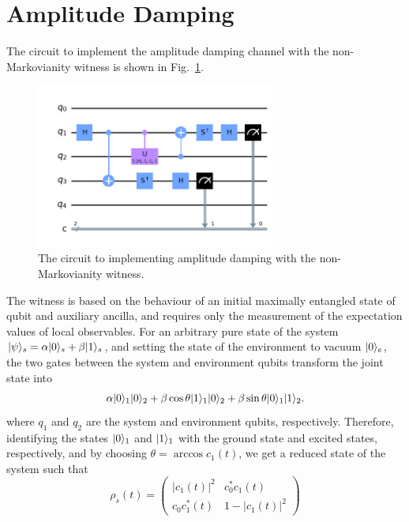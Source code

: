 \documentclass[12pt]{article}
\DeclarePairedDelimiter{\ket}{\lvert}{\rangle}
\begin{document}
  \section{Amplitude Damping}
  The circuit to implement the amplitude damping channel with the non-Markovianity witness is shown in Fig.~\ref{fig:amplitude_damping_circuit}.
  \begin{figure}
    \centering
    \includegraphics[width=0.7\textwidth]{images/amplitude_damping_yy_circuit.png}
    \caption{The circuit to implementing amplitude damping with the non-Markovianity witness.%
      \label{fig:amplitude_damping_circuit}}
  \end{figure}
  The witness is based on the behaviour of an initial maximally entangled state of qubit and auxiliary ancilla, and requires only the measurement of the expectation values of local observables.
  For an arbitrary pure state of the system \( \ket{\psi}_{s} = \alpha \ket{0}_{s} + \beta \ket{1}_{s} \), and setting the state of the environment to vacuum \( \ket{0}_{e} \), the two gates between the system and environment qubits transform the joint state into
  \begin{equation}
    \alpha \ket{0}_{1} \ket{0}_{2} + \beta \cos \theta \ket{1}_{1} \ket{0}_{2}
    + \beta \sin \theta \ket{0}_{1} \ket{1}_{2}.
  \end{equation}
  where \( q_{1} \) and \( q_{2} \) are the system and environment qubits, respectively. Therefore, identifying the states \( \ket{0}_{1} \) and \( \ket{1}_{1} \) with the ground state and excited states, respectively, and by choosing \( \theta = \arccos c_{1}(t) \), we get a reduced state of the system such that
  \begin{equation}
    \rho_{s}(t)
      = \begin{pmatrix}
          \lvert c_{1}(t) \rvert^{2} & c_{0}^{*} c_{1}(t)             \\
          c_{0} c_{1}^{*}(t)         & 1 - \lvert c_{1}(t) \rvert^{2}
        \end{pmatrix}
  \end{equation}
\end{document}
